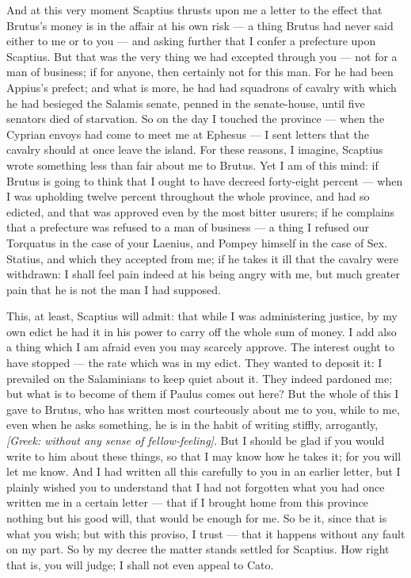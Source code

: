 And at this very moment Scaptius thrusts upon me a letter to the effect that Brutus's money is in the affair at his own risk --- a thing Brutus had never said either to me or to you --- and asking further that I confer a prefecture upon Scaptius. But that was the very thing we had excepted through you --- not for a man of business; if for anyone, then certainly not for this man. For he had been Appius's prefect; and what is more, he had had squadrons of cavalry with which he had besieged the Salamis senate, penned in the senate-house, until five senators died of starvation. So on the day I touched the province --- when the Cyprian envoys had come to meet me at Ephesus --- I sent letters that the cavalry should at once leave the island. For these reasons, I imagine, Scaptius wrote something less than fair about me to Brutus. Yet I am of this mind: if Brutus is going to think that I ought to have decreed forty-eight percent --- when I was upholding twelve percent throughout the whole province, and had so edicted, and that was approved even by the most bitter usurers; if he complains that a prefecture was refused to a man of business --- a thing I refused our Torquatus in the case of your Laenius, and Pompey himself in the case of Sex. Statius, and which they accepted from me; if he takes it ill that the cavalry were withdrawn: I shall feel pain indeed at his being angry with me, but much greater pain that he is not the man I had supposed.

 This, at least, Scaptius will admit: that while I was administering justice, by my own edict he had it in his power to carry off the whole sum of money. I add also a thing which I am afraid even you may scarcely approve. The interest ought to have stopped --- the rate which was in my edict. They wanted to deposit it: I prevailed on the Salaminians to keep quiet about it. They indeed pardoned me; but what is to become of them if Paulus comes out here? But the whole of this I gave to Brutus, who has written most courteously about me to you, while to me, even when he asks something, he is in the habit of writing stiffly, arrogantly, \textit{[Greek: without any sense of fellow-feeling]}. But I should be glad if you would write to him about these things, so that I may know how he takes it; for you will let me know. And I had written all this carefully to you in an earlier letter, but I plainly wished you to understand that I had not forgotten what you had once written me in a certain letter --- that if I brought home from this province nothing but his good will, that would be enough for me. So be it, since that is what you wish; but with this proviso, I trust --- that it happens without any fault on my part. So by my decree the matter stands settled for Scaptius. How right that is, you will judge; I shall not even appeal to Cato.

